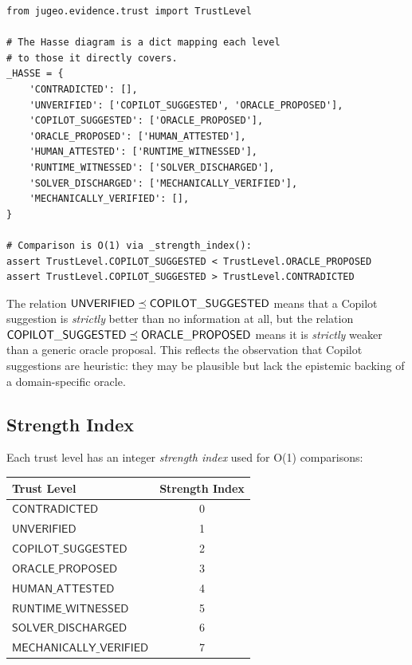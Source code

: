 \documentclass[11pt]{article}
\newcommand{\CopSugg}{\mathsf{COPILOT\_SUGGESTED}}
\newcommand{\MechVer}{\mathsf{MECHANICALLY\_VERIFIED}}
\newcommand{\SolDis}{\mathsf{SOLVER\_DISCHARGED}}
\newcommand{\OracProp}{\mathsf{ORACLE\_PROPOSED}}
\newcommand{\HumAtt}{\mathsf{HUMAN\_ATTESTED}}
\newcommand{\RunWit}{\mathsf{RUNTIME\_WITNESSED}}
\newcommand{\Unver}{\mathsf{UNVERIFIED}}
\newcommand{\Contra}{\mathsf{CONTRADICTED}}
\begin{document}
\begin{lstlisting}[style=jugeo-python]
from jugeo.evidence.trust import TrustLevel

# The Hasse diagram is a dict mapping each level
# to those it directly covers.
_HASSE = {
    'CONTRADICTED': [],
    'UNVERIFIED': ['COPILOT_SUGGESTED', 'ORACLE_PROPOSED'],
    'COPILOT_SUGGESTED': ['ORACLE_PROPOSED'],
    'ORACLE_PROPOSED': ['HUMAN_ATTESTED'],
    'HUMAN_ATTESTED': ['RUNTIME_WITNESSED'],
    'RUNTIME_WITNESSED': ['SOLVER_DISCHARGED'],
    'SOLVER_DISCHARGED': ['MECHANICALLY_VERIFIED'],
    'MECHANICALLY_VERIFIED': [],
}

# Comparison is O(1) via _strength_index():
assert TrustLevel.COPILOT_SUGGESTED < TrustLevel.ORACLE_PROPOSED
assert TrustLevel.COPILOT_SUGGESTED > TrustLevel.CONTRADICTED
\end{lstlisting}

\begin{remark}
The relation $\Unver \tleq \CopSugg$ means that a Copilot suggestion is
\emph{strictly} better than no information at all, but the relation $\CopSugg
\tleq \OracProp$ means it is \emph{strictly} weaker than a generic oracle
proposal.  This reflects the observation that Copilot suggestions are
heuristic: they may be plausible but lack the epistemic backing of a
domain-specific oracle.
\end{remark}

\subsection{Strength Index}\label{sec:strength}

Each trust level has an integer \emph{strength index} used for O(1)
comparisons:

\begin{center}
\begin{tabular}{lc}
\toprule
\textbf{Trust Level} & \textbf{Strength Index} \\
\midrule
$\Contra$   & 0 \\
$\Unver$    & 1 \\
$\CopSugg$  & 2 \\
$\OracProp$ & 3 \\
$\HumAtt$   & 4 \\
$\RunWit$   & 5 \\
$\SolDis$   & 6 \\
$\MechVer$  & 7 \\
\bottomrule
\end{tabular}
\end{center}
\end{document}
